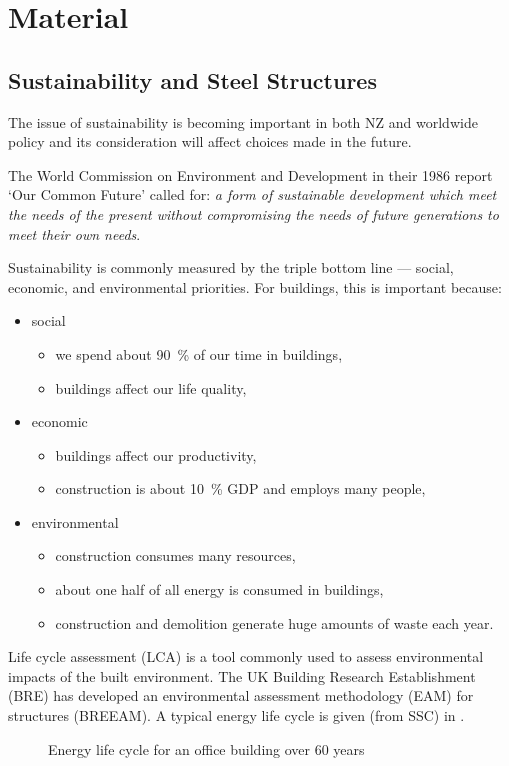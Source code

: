 \chapter{Material}
\section{Sustainability and Steel Structures}
The issue of sustainability is becoming important in both NZ and worldwide policy and its consideration will affect choices made in the future.

The World Commission on Environment and Development in their 1986 report `Our Common Future' called for: \textit{a form of sustainable development which meet the needs of the present without compromising the needs of future generations to meet their own needs}.

Sustainability is commonly measured by the triple bottom line --- social, economic, and environmental priorities. For buildings, this is important because:
\begin{itemize}
\item social
\begin{itemize}
\item we spend about \SI{90}{\percent} of our time in buildings,
\item buildings affect our life quality,
\end{itemize}
\item economic
\begin{itemize}
\item buildings affect our productivity,
\item construction is about \SI{10}{\percent} GDP and employs many people,
\end{itemize}
\item environmental
\begin{itemize}
\item construction consumes many resources,
\item about one half of all energy is consumed in buildings,
\item construction and demolition generate huge amounts of waste each year.
\end{itemize}
\end{itemize}

Life cycle assessment (LCA) is a tool commonly used to assess environmental impacts of the built environment. The UK Building Research Establishment (BRE) has developed an environmental assessment methodology (EAM) for structures (BREEAM). A typical energy life cycle is given (from SSC) in .
\begin{figure}[H]
\centering

\caption{Energy life cycle for an office building over \num{60} years}\label{fig:life_cycle}
\end{figure}

